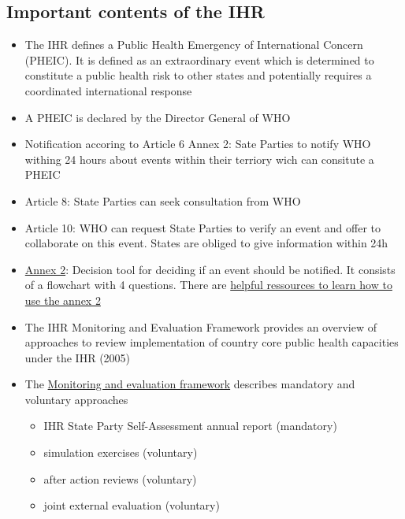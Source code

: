 \documentclass[
  letterpaper,
  DIV=11,
  numbers=noendperiod]{scrreprt}
\providecommand{\tightlist}{%
  \setlength{\itemsep}{0pt}\setlength{\parskip}{0pt}}\usepackage{longtable,booktabs,array}
\begin{document}
\subsection{Important contents of the
IHR}\label{important-contents-of-the-ihr}

\begin{itemize}
\tightlist
\item
  The IHR defines a Public Health Emergency of International Concern
  (PHEIC). It is defined as an extraordinary event which is determined
  to constitute a public health risk to other states and potentially
  requires a coordinated international response
\item
  A PHEIC is declared by the Director General of WHO
\item
  Notification accoring to Article 6 Annex 2: Sate Parties to notify WHO
  withing 24 hours about events within their terriory wich can consitute
  a PHEIC
\item
  Article 8: State Parties can seek consultation from WHO
\item
  Article 10: WHO can request State Parties to verify an event and offer
  to collaborate on this event. States are obliged to give information
  within 24h
\item
  \href{https://iris.who.int/bitstream/handle/10665/246107/9789241580496-eng.pdf?sequence=1}{Annex
  2}: Decision tool for deciding if an event should be notified. It
  consists of a flowchart with 4 questions. There are
  \href{https://www.who.int/publications/m/item/annex-2-of-the-international-health-regulations-(2005)}{helpful
  ressources to learn how to use the annex 2}
\item
  The IHR Monitoring and Evaluation Framework provides an overview of
  approaches to review implementation of country core public health
  capacities under the IHR (2005)
\item
  The
  \href{https://www.who.int/emergencies/operations/international-health-regulations-monitoring-evaluation-framework}{Monitoring
  and evaluation framework} describes mandatory and voluntary approaches

  \begin{itemize}
  \tightlist
  \item
    IHR State Party Self-Assessment annual report (mandatory)
  \item
    simulation exercises (voluntary)
  \item
    after action reviews (voluntary)
  \item
    joint external evaluation (voluntary)
  \end{itemize}
\end{itemize}
\end{document}
